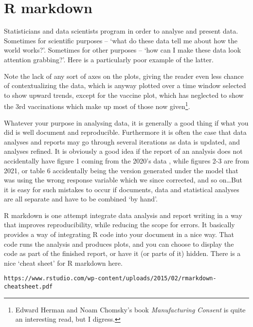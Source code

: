 \documentclass[10pt] {article}
\newcommand{\eps}[3]
{{\begin{center}
 \rotatebox{#1}{\scalebox{#2}{\texttt{[image: \#3]}}}
 \end{center}}
}
\theoremstyle{definition}
\begin{document}
\begin{lstlisting}

\end{lstlisting}

\section{R markdown}

Statisticians and data scientists program in order to analyse and present data. Sometimes for scientific purposes -- `what do these data tell me about how the world works?'. Sometimes for other purposes -- `how can I make these data look attention grabbing?'. Here is a particularly poor example of the latter. 
\eps{0}{.2}{BBC2021-10-25}
Note the lack of any sort of axes on the plots, giving the reader even less chance of contextualizing the data, which is anyway plotted over a time window selected to show upward trends, except for the vaccine plot, which has neglected to show the 3rd vaccinations which make up most of those now given\footnote{Edward Herman and Noam Chomsky's book {\em Manufacturing Consent} is quite an interesting read, but I digress.}.   

Whatever your purpose in analysing data, it is generally a good thing if what you did is well document and reproducible. Furthermore it is often the case that data analyses and reports may go through several iterations as data is updated, and analyses refined. It is obviously a good idea if the report of an analysis does not accidentally have figure 1 coming from the 2020's data , while figures 2-3 are from 2021, or table 6 accidentally being the version generated under the model that was using the wrong response variable which we since corrected, and so on\ldots But it is easy for such mistakes to occur if documents, data and statistical analyses are all separate and have to be combined `by hand'. 

R markdown is one attempt integrate data analysis and report writing in a way that improves reproducibility, while reducing the scope for errors. It basically provides a way of integrating R code into your document in a nice way. That code runs the analysis and produces plots, and you can choose to display the code as part of the finished report, or have it (or parts of it) hidden. There is a nice `cheat sheet' for R markdown here.
\begin{lstlisting}
https://www.rstudio.com/wp-content/uploads/2015/02/rmarkdown-cheatsheet.pdf
\end{lstlisting}


\printindex
\end{document}
